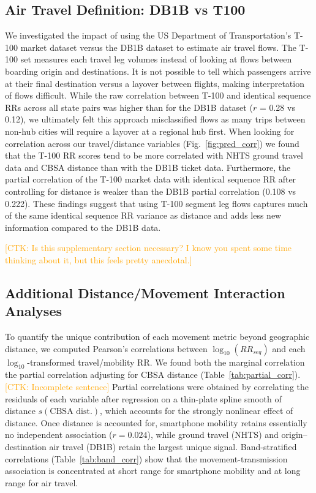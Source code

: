 \documentclass[11pt, letterpaper, oneside]{article}
\def\ctkc#1{\textcolor{orange}{[CTK: #1]}}
\begin{document}
\subsection{Air Travel Definition: DB1B vs T100}
We investigated the impact of using the US Department of Transportation's T-100 market dataset versus the DB1B dataset to estimate air travel flows.
The T-100 set measures each travel leg volumes instead of looking at flows between boarding origin and destinations.
It is not possible to tell which passengers arrive at their final destination versus a layover between flights, making interpretation of flows difficult.
While the raw correlation between T-100 and identical sequence RRs across all state pairs was higher than for the DB1B dataset ($r$ = 0.28 vs 0.12), we ultimately felt this approach misclassified flows as many trips between non-hub cities will require a layover at a regional hub first.
When looking for correlation across our travel/distance variables (Fig.\ \ref{fig:pred_corr}) we found that the T-100 RR scores tend to be more correlated with NHTS ground travel data and CBSA distance than with the DB1B ticket data.
Furthermore, the partial correlation of the T-100 market data with identical sequence RR after controlling for distance is weaker than the DB1B partial correlation (0.108 vs 0.222).
These findings suggest that using T-100 segment leg flows captures much of the same identical sequence RR variance as distance and adds less new information compared to the DB1B data.

\ctkc{Is this supplementary section necessary? I know you spent some time thinking about it, but this feels pretty anecdotal.}

\subsection{Additional Distance/Movement Interaction Analyses}

To quantify the unique contribution of each movement metric beyond geographic distance, we computed Pearson's correlations between $\log_{10}(RR_{seq})$ and each $\log_{10}$-transformed travel/mobility RR.
We found both the marginal correlation the partial correlation adjusting for CBSA distance (Table~\ref{tab:partial_corr}). \ctkc{Incomplete sentence}
Partial correlations were obtained by correlating the residuals of each variable after regression on a thin-plate spline smooth of distance $s(\text{CBSA dist.})$, which accounts for the strongly nonlinear effect of distance.
Once distance is accounted for, smartphone mobility retains essentially no independent association ($r=0.024$), while ground travel (NHTS) and origin--destination air travel (DB1B) retain the largest unique signal.
Band-stratified correlations (Table~\ref{tab:band_corr}) show that the movement-transmission association is concentrated at short range for smartphone mobility and at long range for air travel.
\end{document}
